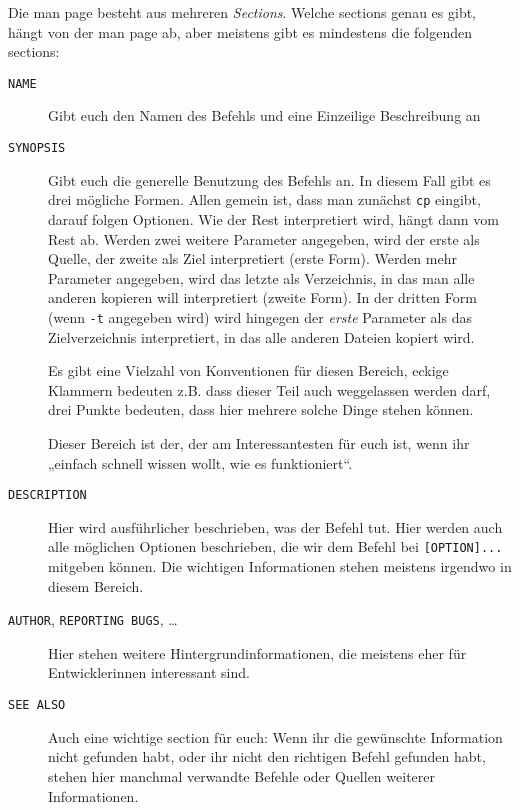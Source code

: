     Die man page besteht aus mehreren \emph{Sections}. Welche sections genau es
    gibt, hängt von der man page ab, aber meistens gibt es mindestens die folgenden
    sections:
    \begin{description}
        \item[\texttt{NAME}]
              Gibt euch den Namen des Befehls und eine Einzeilige Beschreibung an
        \item[\texttt{SYNOPSIS}]
              Gibt euch die generelle Benutzung des Befehls an. In diesem Fall gibt
              es drei mögliche Formen. Allen gemein ist, dass man zunächst
              \texttt{cp} eingibt, darauf folgen Optionen. Wie der Rest interpretiert
              wird, hängt dann vom Rest ab. Werden zwei weitere Parameter angegeben,
              wird der erste als Quelle, der zweite als Ziel interpretiert (erste
              Form). Werden mehr Parameter angegeben, wird das letzte als
              Verzeichnis, in das man alle anderen kopieren will interpretiert
              (zweite Form). In der dritten Form (wenn \texttt{-t} angegeben wird)
              wird hingegen der \emph{erste} Parameter als das Zielverzeichnis
              interpretiert, in das alle anderen Dateien kopiert wird.

              Es gibt eine Vielzahl von Konventionen für diesen Bereich, eckige
              Klammern bedeuten z.B. dass dieser Teil auch weggelassen werden darf,
              drei Punkte bedeuten, dass hier mehrere solche Dinge stehen können.

              Dieser Bereich ist der, der am Interessantesten für euch ist, wenn ihr
              „einfach schnell wissen wollt, wie es funktioniert“.
        \item[\texttt{DESCRIPTION}]
              Hier wird ausführlicher beschrieben, was der Befehl tut. Hier werden
              auch alle möglichen Optionen beschrieben, die wir dem Befehl bei
              \texttt{[OPTION]...} mitgeben können. Die wichtigen Informationen
              stehen meistens irgendwo in diesem Bereich.
        \item[\texttt{AUTHOR}, \texttt{REPORTING BUGS}, \dots]
              Hier stehen weitere Hintergrundinformationen, die meistens eher für
              Entwicklerinnen interessant sind.
        \item[\texttt{SEE ALSO}]
              Auch eine wichtige section für euch: Wenn ihr die gewünschte
              Information nicht gefunden habt, oder ihr nicht den richtigen Befehl
              gefunden habt, stehen hier manchmal verwandte Befehle oder Quellen
              weiterer Informationen.
    \end{description}

